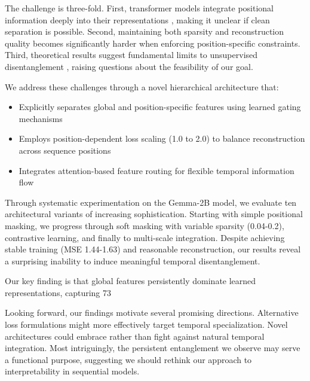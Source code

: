 \documentclass{article} %
\begin{document}
The challenge is three-fold. First, transformer models integrate positional information deeply into their representations \cite{Sinha2022TheCC}, making it unclear if clean separation is possible. Second, maintaining both sparsity and reconstruction quality becomes significantly harder when enforcing position-specific constraints. Third, theoretical results suggest fundamental limits to unsupervised disentanglement \cite{Locatello2018ChallengingCA}, raising questions about the feasibility of our goal.

We address these challenges through a novel hierarchical architecture that:
\begin{itemize}
    \item Explicitly separates global and position-specific features using learned gating mechanisms
    \item Employs position-dependent loss scaling (1.0 to 2.0) to balance reconstruction across sequence positions
    \item Integrates attention-based feature routing for flexible temporal information flow
\end{itemize}

Through systematic experimentation on the Gemma-2B model, we evaluate ten architectural variants of increasing sophistication. Starting with simple positional masking, we progress through soft masking with variable sparsity (0.04-0.2), contrastive learning, and finally to multi-scale integration. Despite achieving stable training (MSE 1.44-1.63) and reasonable reconstruction, our results reveal a surprising inability to induce meaningful temporal disentanglement.

Our key finding is that global features persistently dominate learned representations, capturing 73%

Looking forward, our findings motivate several promising directions. Alternative loss formulations might more effectively target temporal specialization. Novel architectures could embrace rather than fight against natural temporal integration. Most intriguingly, the persistent entanglement we observe may serve a functional purpose, suggesting we should rethink our approach to interpretability in sequential models.
\end{document}
